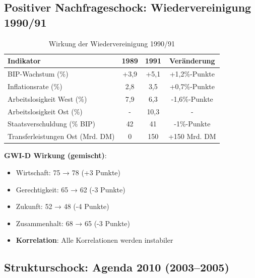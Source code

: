 \subsection{Positiver Nachfrageschock: Wiedervereinigung 1990/91}

\begin{table}[ht]
\centering
\begin{tabular}{lccc}
\toprule
\textbf{Indikator} & \textbf{1989} & \textbf{1991} & \textbf{Veränderung} \\
\midrule
BIP-Wachstum (\%) & +3,9 & +5,1 & +1,2\%-Punkte \\
Inflationsrate (\%) & 2,8 & 3,5 & +0,7\%-Punkte \\
Arbeitslosigkeit West (\%) & 7,9 & 6,3 & -1,6\%-Punkte \\
Arbeitslosigkeit Ost (\%) & - & 10,3 & - \\
Staatsverschuldung (\% BIP) & 42 & 41 & -1\%-Punkte \\
Transferleistungen Ost (Mrd. DM) & 0 & 150 & +150 Mrd. DM \\
\bottomrule
\end{tabular}
\caption{Wirkung der Wiedervereinigung 1990/91}
\label{tab:wiedervereinigung-schock}
\end{table}

\textbf{GWI-D Wirkung (gemischt)}:
\begin{itemize}
\item Wirtschaft: 75 → 78 (+3 Punkte)
\item Gerechtigkeit: 65 → 62 (-3 Punkte)
\item Zukunft: 52 → 48 (-4 Punkte)
\item Zusammenhalt: 68 → 65 (-3 Punkte)
\item \textbf{Korrelation}: Alle Korrelationen werden instabiler
\end{itemize}

\subsection{Strukturschock: Agenda 2010 (2003--2005)}

